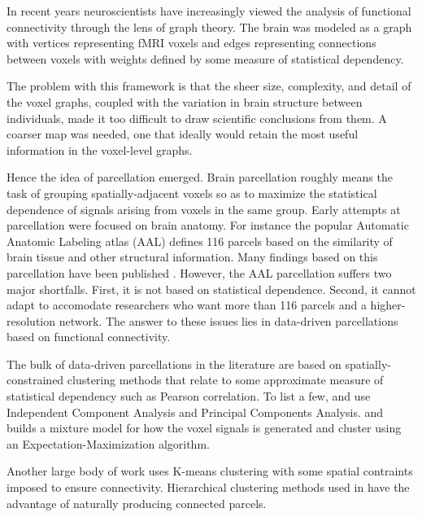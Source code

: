 In recent years neuroscientists have increasingly viewed the analysis
of functional connectivity through the lens of graph theory. The brain
was modeled as a graph with vertices representing fMRI voxels and edges
representing connections between voxels with weights defined by some
measure of statistical dependency.

The problem with this framework is that the sheer size, complexity, and
detail of the voxel graphs, coupled with the variation in brain structure
between individuals, made it too difficult to draw scientific
conclusions from them. A coarser map was needed, one that ideally would
retain the most useful information in the voxel-level graphs.

Hence the idea of parcellation emerged. Brain parcellation roughly means
the task of grouping spatially-adjacent voxels so as to maximize the
statistical dependence of signals arising from voxels in the same group.
Early attempts at parcellation were focused on brain anatomy. For
instance the popular Automatic Anatomic Labeling atlas (AAL)
\cite{tzourio2002automated} defines 116 parcels based on the similarity
of brain tissue and other structural information. Many findings based on
this parcellation have been published \cite{hartman2011role,
he2009uncovering, liu2008disrupted, lynall2010functional,
power2011functional, salvador2005neurophysiological,
spoormaker2010development, supekar2008network, tian2011hemisphere,
wang2009parcellation}. However, the AAL parcellation suffers two major
shortfalls. First, it is not based on statistical dependence. Second,
it cannot adapt to accomodate researchers who want more than 116 parcels
and a higher-resolution network. The answer to these issues lies in
data-driven parcellations based on functional connectivity.

The bulk of data-driven parcellations in the literature are based on
spatially-constrained clustering methods that relate to some approximate
measure of statistical dependency such as Pearson correlation.
To list a few, \cite{biswal2010toward, smith2009correspondence} and
\cite{chen2008group} use Independent Component Analysis and Principal
Components Analysis. \cite{beckmann2005investigations, de2006fmri} and 
\cite{ryali2013parcellation} builds a mixture model
for how the voxel signals is generated and cluster using an
Expectation-Maximization algorithm.

Another large body of work uses K-means clustering
\cite{flandin2002parcellation, mezer2009cluster,peltier2003detecting,
thirion2006dealing} with some spatial contraints imposed to ensure
connectivity. Hierarchical clustering methods used in
\cite{diez2014novel, bellec2006identification, lu2003region,
heller2006cluster, blumensath2013spatially, pohl2007hierarchical}
have the advantage of naturally producing connected parcels.

